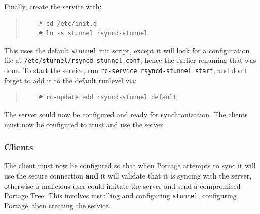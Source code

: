 \documentclass{article}
\begin{document}
Finally, create the service with:
\begin{quote}
\begin{verbatim}
	# cd /etc/init.d
	# ln -s stunnel rsyncd-stunnel
\end{verbatim}
\end{quote}
This uses the default \texttt{stunnel} init script, except it will look for a configuration file at \texttt{/etc/stunnel/rsyncd-stunnel.conf}, hence the earlier renaming that was done.  To start the service, run \texttt{rc-service rsyncd-stunnel start}, and don't forget to add it to the default runlevel via:
\begin{quote}
\begin{verbatim}
	# rc-update add rsyncd-stunnel default
\end{verbatim}
\end{quote}

The server sould now be configured and ready for synchronization.  The clients must now be configured to trust and use the server.

\subsubsection{Clients}
The client must now be configured so that when Poratge attempts to sync it will use the secure connection \textbf{and} it will validate that it is syncing with the server, otherwise a malicious user could imitate the server and send a compromised Portage Tree.  This involves installing and configuring \texttt{stunnel}, configuring Portage, then creating the service.
\end{document}
